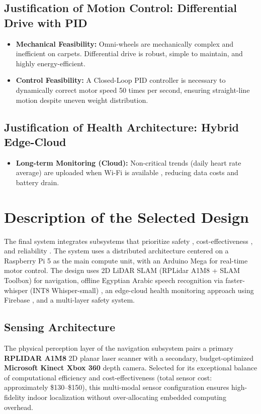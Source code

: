 \documentclass[12pt,a4paper]{report}
\begin{document}
\subsection{Justification of Motion Control: Differential Drive with PID}

\begin{itemize}
    \item \textbf{Mechanical Feasibility:} Omni-wheels are mechanically complex and inefficient on carpets. Differential drive is robust, simple to maintain, and highly energy-efficient.
    \item \textbf{Control Feasibility:} A Closed-Loop PID controller \cite{pid_control} is necessary to dynamically correct motor speed 50 times per second, ensuring straight-line motion despite uneven weight distribution.
\end{itemize}

\subsection{Justification of Health Architecture: Hybrid Edge-Cloud}

\begin{itemize}
    
    \item \textbf{Long-term Monitoring (Cloud):} Non-critical trends (daily heart rate average) are uploaded when Wi-Fi is available \cite{sonekar_2024}, reducing data costs and battery drain.
\end{itemize}

\section{Description of the Selected Design}

The final system integrates subsystems that prioritize safety \cite{iso13482}, cost-effectiveness \cite{grandview_market}, and reliability \cite{ros2}. The system uses a distributed architecture centered on a Raspberry Pi 5 as the main compute unit, with an Arduino Mega for real-time motor control. The design uses 2D LiDAR SLAM (RPLidar A1M8 + SLAM Toolbox) for navigation, offline Egyptian Arabic speech recognition via faster-whisper (INT8 Whisper-small) , an edge-cloud health monitoring approach using Firebase \cite{sonekar_2024}, and a multi-layer safety system.
\subsection{Sensing Architecture}
The physical perception layer of the navigation subsystem pairs a primary \textbf{RPLIDAR A1M8} 2D planar laser scanner with a secondary, budget-optimized \textbf{Microsoft Kinect Xbox 360} depth camera. Selected for its exceptional balance of computational efficiency and cost-effectiveness (total sensor cost: approximately \$130--\$150), this multi-modal sensor configuration ensures high-fidelity indoor localization without over-allocating embedded computing overhead.
\end{document}
